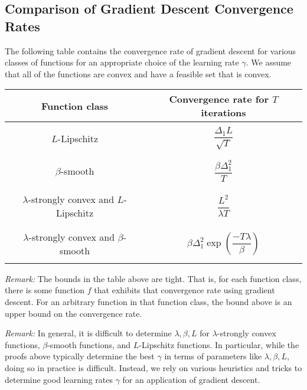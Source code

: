 \documentclass[12pt]{report}
\begin{document}
\subsection{Comparison of Gradient Descent Convergence Rates}

The following table contains the convergence rate of gradient descent for various classes of functions for an appropriate choice of the learning rate $\gamma$. We assume that all of the functions are convex and have a feasible set that is convex.

\begin{center}
	\begin{tabular}{ c | c }
		\hline
		{\bf Function class} & {\bf Convergence rate for $T$ iterations}\\
		\hline
		\\ 
		$L$-Lipschitz & $\dfrac{\Delta_1 L}{\sqrt{T}}$\\
		\\
		\hline
		\\
		$\beta$-smooth & $\dfrac{\beta\Delta_1^2}{T}$\\
		\\
		\hline
		\\
		$\lambda$-strongly convex and $L$-Lipschitz & $\dfrac{L^2}{\lambda T}$ \\ 
		\\
		\hline
		\\
		$\lambda$-strongly convex and $\beta$-smooth & $\beta\Delta_1^2\exp(\dfrac{-T\lambda}{\beta})$\\
		\\
		\hline
	\end{tabular}
\end{center}

{\it Remark:} The bounds in the table above are tight. That is, for each function class, there is some function $f$ that exhibits that convergence rate using gradient descent. For an arbitrary function in that function class, the bound above is an upper bound on the convergence rate.

\medskip

{\it Remark:} In general, it is difficult to determine $\lambda, \beta, L$ for $\lambda$-strongly convex functions, $\beta$-smooth functions, and $L$-Lipschitz functions. In particular, while the proofs above typically determine the best $\gamma$ in terms of parameters like $\lambda, \beta, L$, doing so in practice is difficult. Instead, we rely on various heuristics and tricks to determine good learning rates $\gamma$ for an application of gradient descent.
\end{document}
